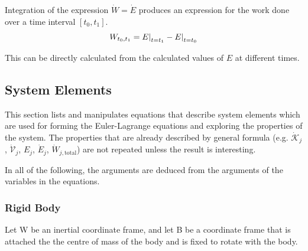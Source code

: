 \documentclass[11pt]{article}
\begin{document}
Integration of the expression $\dot{W}=\dot{E}$ produces an expression for the work done over a time interval $[t_0,t_1]$.
\begin{equation}
    W_{t_0,t_1} = \eval[0]{E}_{t=t_1} - \eval[0]{E}_{t=t_0}
\end{equation}

This can be directly calculated from the calculated values of $E$ at different times.


\subsection{System Elements} \label{ssec:d:elements}
This section lists and manipulates equations that describe system elements which are used for forming the Euler-Lagrange equations and exploring the properties of the system. The properties that are already described by general formula (e.g. $\dot{\mathcal{K}}_j$, $\dot{\mathcal{V}}_j$, $E_j$, $\dot{E}_j$, $\dot{W}_{j,\mathrm{total}}$) are not repeated unless the result is interesting.

In all of the following, the arguments are deduced from the arguments of the variables in the equations.

\subsubsection{Rigid Body} \label{ssec:d:elements:massRB}

Let W be an inertial coordinate frame, and let B be a coordinate frame that is attached the the centre of mass of the body and is fixed to rotate with the body.
\end{document}
